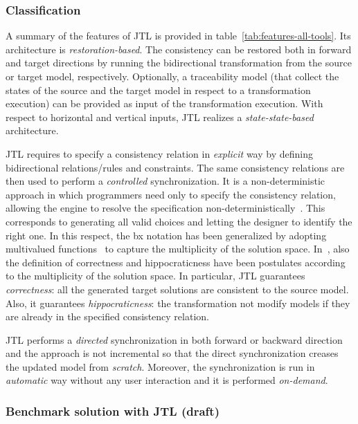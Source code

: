 \subsubsection{Classification}
A summary of the features of JTL is provided in table~\ref{tab:features-all-tools}. Its architecture is \emph{restoration-based}.
%
The consistency can be restored both in forward and target directions by running the bidirectional transformation from the source or target model, respectively. Optionally, a traceability model (that collect the  states of the source and the target model in respect to a transformation execution) can be provided as input of the transformation execution. 
%
With respect to horizontal and vertical inputs, JTL realizes a \emph{state-state-based} architecture.

JTL requires to specify a consistency relation in \emph{explicit} way by defining bidirectional relations/rules and constraints. The same consistency relations are then used to perform a \emph{controlled} synchronization. It is a non-deterministic approach in which programmers need only to specify the consistency relation, allowing the engine to resolve the specification non-deterministically~\cite{AbouSaleh:2015de}. This corresponds to generating all valid choices and letting the designer to identify the right one. In this respect, the bx notation has been generalized by adopting multivalued functions~\cite{EPR15} to capture the multiplicity of the solution space. In~\cite{EPR15}, also the definition of correctness and hippocraticness have been postulates according to the multiplicity of the solution space. In particular, JTL guarantees
\emph{correctness}: all the generated target solutions are consistent to the source model. Also, it guarantees \emph{hippocraticness}: the transformation not modify models if they are already in the specified consistency relation. 

JTL performs a \emph{directed} synchronization in both forward or backward direction and the approach is not incremental so that the direct synchronization creases the updated model from \emph{scratch}. Moreover, the synchronization is run in \emph{automatic} way without any user interaction and it is performed \emph{on-demand}.  



\subsubsection{Benchmark solution with JTL (draft)}


